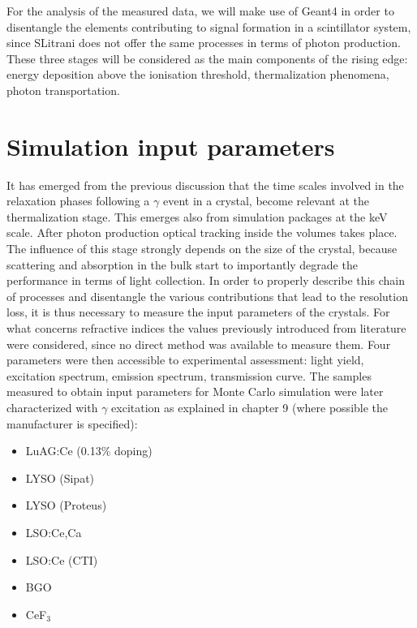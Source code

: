 For the analysis of the measured data, we will make use of Geant4 in order to disentangle the elements contributing to signal formation in a scintillator system, since SLitrani does not offer the same processes in terms of photon production.
These three stages will be considered as the main components of the rising edge: energy deposition above the ionisation threshold, thermalization phenomena, photon transportation.
\newpage
\section{Simulation input parameters}

It has emerged from the previous discussion that the time scales involved in the relaxation phases following a $\gamma$ event in a crystal, become relevant at the thermalization stage. This emerges also from simulation packages at the keV scale.
After photon production optical tracking inside the volumes takes place. The influence of this stage strongly depends on the size of the crystal, because scattering and absorption in the bulk start to importantly degrade the performance in terms of light collection.
In order to properly describe this chain of processes and disentangle the various contributions that lead to the resolution loss, it is thus necessary to measure the input parameters of the crystals.
For what concerns refractive indices the values previously introduced from literature were considered, since no direct method was available to measure them.
Four parameters were then accessible to experimental assessment: light yield, excitation spectrum, emission spectrum, transmission curve.
The samples measured to obtain input parameters for Monte Carlo simulation were later characterized with $\gamma$ excitation as explained in chapter 9 (where possible the manufacturer is specified): 
\begin{itemize}
\item LuAG:Ce (0.13$\%$ doping)
\item LYSO (Sipat)
\item LYSO (Proteus)
\item LSO:Ce,Ca 
\item LSO:Ce (CTI)
\item BGO
\item CeF$_{3}$
\end{itemize}
